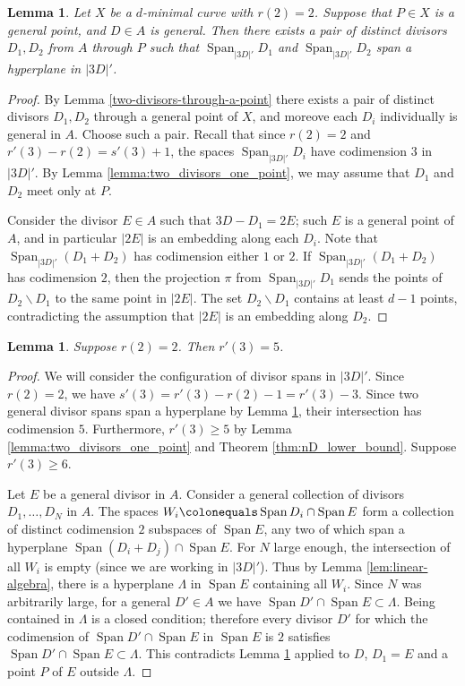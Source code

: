 \documentclass[11pt]{amsart}
\newcommand{\Span}{\operatorname{Span}}
\newtheorem{lemma}[theorem]{Lemma}
\theoremstyle{definition}
\theoremstyle{remark}
\begin{document}
\begin{lemma}\label{lem:no-extra-intersecions}
Let \(X\) be a \(d\)-minimal curve with \(r(2) = 2\).
Suppose that $P \in X$ is a general point, and $D \in A$ is general. Then there exists a pair of distinct divisors $D_1, D_2$  from $A$ through $P$ such that $\Span_{|3D|'}D_1$ and $\Span_{|3D|'}D_2$ span a hyperplane in $|3D|'$.
\end{lemma}
\begin{proof}
By Lemma \ref{two-divisors-through-a-point} there exists a pair of distinct divisors $D_1, D_2$ through a general point of $X$, and moreove each $D_i$ individually is general in $A$. Choose such a pair.
Recall that since \(r(2)=2\) and \(r'(3) - r(2) = s'(3) + 1\), the spaces $\Span_{|3D|'}D_i$ have codimension \(3\) in \(|3D|'\).  By Lemma \ref{lemma:two_divisors_one_point}, we may assume that \(D_1\) and \(D_2\) meet only at \(P\). 

Consider the divisor $E \in A$ such that $3D-D_1=2E$; such $E$ is a general point of $A$, and in particular $|2E|$ is an embedding along each $D_i$. Note that $\Span_{|3D|'}(D_1+D_2)$ has codimension either \(1\) or \(2\).
If $\Span_{|3D|'}(D_1+D_2)$ has codimension \(2\), then the projection $\pi$ from $\Span_{|3D|'}D_1$ sends the points of $D_2 \smallsetminus D_1$ to the same point in $|2E|$. The set $D_2 \smallsetminus D_1$ contains at least $d-1$ points, contradicting the assumption that $|2E|$ is an embedding along \(D_2\).
\end{proof}

\begin{lemma}\label{lem:rprime_3}
Suppose $r(2)=2$. Then $r'(3)=5$.
\end{lemma}
\begin{proof}
We will consider the configuration of divisor spans in \(|3D|'\).
Since \(r(2) = 2\), we have $s'(3)=r'(3)-r(2)-1=r'(3)-3$.  Since two general divisor spans span a hyperplane by Lemma \ref{lem:no-extra-intersecions}, their intersection has codimension \(5\).
Furthermore, $r'(3) \geqslant 5$ by Lemma \ref{lemma:two_divisors_one_point} and Theorem \ref{thm:nD_lower_bound}. Suppose $r'(3) \geqslant 6. $   

Let \(E\) be a general divisor in \(A\).  Consider a general collection of divisors \(D_1, \dots, D_N\) in \(A\).  The spaces $W_{i} \colonequals \Span D_i \cap \Span E$
form a collection of distinct codimension \(2\) subspaces of \(\Span E\), any two of which span a hyperplane \(\Span(D_i + D_j) \cap \Span E\).  For \(N\) large enough, the intersection of all \(W_{i}\) is empty (since we are working in \(|3D|'\)).  Thus by Lemma \ref{lem:linear-algebra}, there is a hyperplane $\Lambda$ in \(\Span E \) containing all \(W_i\).  Since $N$ was arbitrarily large, for a general $D' \in A$ we have $\Span D' \cap \Span E \subset \Lambda.$ Being contained in $\Lambda$ is a closed condition; therefore every divisor $D'$ for which the codimension of $\Span D'\cap \Span E$ in $\Span E$ is $2$ satisfies $\Span D' \cap \Span E \subset \Lambda$. This contradicts Lemma \ref{lem:no-extra-intersecions} 
applied to $D$, $D_1=E$ and a point $P$ of $E$ outside $\Lambda$.
\end{proof}
\end{document}
